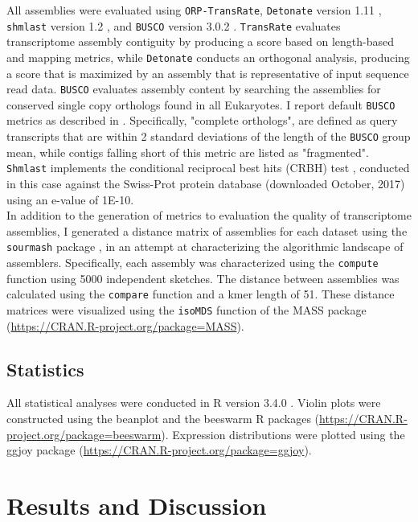 \documentclass[10pt,letterpaper]{article}
\begin{document}
All assemblies were evaluated using \texttt{ORP-TransRate}, \texttt{Detonate} version 1.11 \cite{Li:2014cm}, \texttt{shmlast} version 1.2 \citep{Scott:2017eg}, and \texttt{BUSCO} version 3.0.2 \citep{Simao:2015kk}. \texttt{TransRate} evaluates transcriptome assembly contiguity by producing a score based on length-based and mapping metrics, while \texttt{Detonate} conducts an orthogonal analysis, producing a score that is maximized by an assembly that is representative of input sequence read data. \texttt{BUSCO} evaluates assembly content by searching the assemblies for conserved single copy orthologs found in all Eukaryotes. I report default \texttt{BUSCO} metrics as described in \cite{Simao:2015kk}. Specifically, "complete orthologs", are defined as query transcripts that are within 2 standard deviations of the length of the \texttt{BUSCO} group mean, while contigs falling short of this metric are listed as "fragmented". \texttt{Shmlast} implements the conditional reciprocal best hits (CRBH) test \citep{Aubry:2014en}, conducted in this case against the Swiss-Prot protein database (downloaded October, 2017) using an e-value of 1E-10.   \\

In addition to the generation of metrics to evaluation the quality of transcriptome assemblies, I generated a distance matrix of assemblies for each dataset using the \texttt{sourmash} package \citep{TitusBrown:2016jg}, in an attempt at characterizing the algorithmic landscape of assemblers. Specifically, each assembly was characterized using the \texttt{compute} function using 5000 independent sketches. The distance between assemblies was calculated using the \texttt{compare} function and a kmer length of 51. These distance matrices were visualized using the \texttt{isoMDS} function of the MASS package (\url{https://CRAN.R-project.org/package=MASS}). 

\subsection{Statistics}

All statistical analyses were conducted in R version 3.4.0 \citep{RALanguageandEn:wf}. Violin plots were constructed using the beanplot \citep{Kampstra:2008vc} and the beeswarm R packages (\url{https://CRAN.R-project.org/package=beeswarm}). Expression distributions were plotted using the ggjoy package (\url{https://CRAN.R-project.org/package=ggjoy}).   

\section{Results and Discussion}
\end{document}
